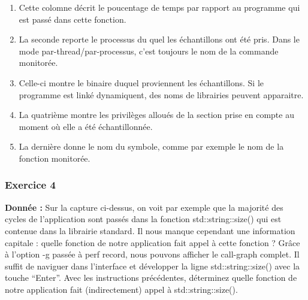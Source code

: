 \begin{enumerate}
\item Cette colomne décrit le poucentage de temps par rapport au programme qui est passé dans cette fonction.
\item La seconde reporte le processus du quel les échantillons ont été pris. Dans le mode par-thread/par-processus, c'est toujours le nom de la commande monitorée. 
\item Celle-ci montre le binaire duquel proviennent les échantillons. Si le programme est linké dynamiquent, des noms de librairies peuvent apparaitre.  
\item La quatrième montre les privilèges alloués de la section prise en compte au moment où elle a été échantillonnée.
\item La dernière donne le nom du symbole, comme par exemple le nom de la fonction monitorée.
\end{enumerate}

\subsubsection{Exercice 4}
\textbf{Donnée : } Sur	la	capture	ci-dessus,	on	voit	par	exemple	que	la	majorité	des	cycles	de	l'application	sont	passés	
dans	la	fonction	std::string::size() qui	est	contenue	dans	la	librairie	standard.	Il	nous	manque	
cependant	une	information	capitale :	quelle	fonction	de	notre	application	fait	appel	à	cette	fonction	?	
Grâce	à	l'option	-g passée	à	perf	record,	nous	pouvons	afficher	le	call-graph	complet.	Il	suffit	de	
naviguer	dans	l'interface	et	développer	la	ligne	std::string::size() avec	la	touche	“Enter”.	
Avec	les	instructions	précédentes,	déterminez quelle	fonction	de	notre	application	fait	(indirectement)	
appel	à	std::string::size().\\\\


